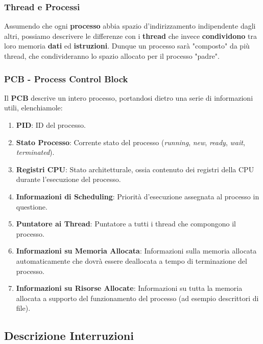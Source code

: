 \documentclass{article}
\begin{document}
\subsubsection{Thread e Processi}

Assumendo che ogni \textbf{processo} abbia spazio d'indirizzamento indipendente dagli altri, possiamo descrivere le differenze con i \textbf{thread} che invece \textbf{condividono} tra loro memoria \textbf{dati} ed \textbf{istruzioni}. Dunque un processo sarà "composto" da più thread, che condivideranno lo spazio allocato per il processo "padre".

\subsubsection{PCB - Process Control Block}

Il \textbf{PCB} descrive un intero processo, portandosi dietro una serie di informazioni utili, elenchiamole:

\begin{enumerate}
    \item \textbf{PID}: ID del processo.
    \item \textbf{Stato Processo}: Corrente stato del processo (\textit{running}, \textit{new}, \textit{ready}, \textit{wait}, \textit{terminated}).
    \item \textbf{Registri CPU}: Stato architetturale, ossia contenuto dei registri della CPU durante l'esecuzione del processo.
    \item \textbf{Informazioni di Scheduling}: Priorità d'esecuzione assegnata al processo in questione.
    \item \textbf{Puntatore ai Thread}: Puntatore a tutti i thread che compongono il processo.
    \item \textbf{Informazioni su Memoria Allocata}: Informazioni sulla memoria allocata automaticamente che dovrà essere deallocata a tempo di terminazione del processo.
    \item \textbf{Informazioni su Risorse Allocate}: Informazioni su tutta la memoria allocata a supporto del funzionamento del processo (ad esempio descrittori di file).
\end{enumerate}

\newpage

\subsection{Descrizione Interruzioni}
\end{document}
